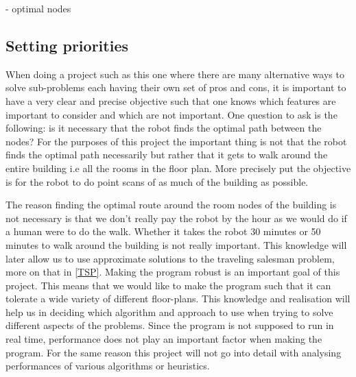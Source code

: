 - optimal nodes

\subsection{Setting priorities}\label{setting_priorities}
When doing a project such as this one where there are many alternative ways to solve sub-problems each having their own set of pros and cons, it is important to have a very clear and precise objective such that one knows which features are important to consider and which are not important. One question to ask is the following: is it necessary that the robot finds the optimal path between the nodes? 
For the purposes of this project the important thing is not that the robot finds the optimal path necessarily but rather that it gets to walk around the entire building i.e all the rooms in the floor plan. More precisely put the objective is for the robot to do point scans of as much of the building as possible. %

The reason finding the optimal route around the room nodes of the building is not necessary is that we don't really pay the robot by the hour as we would do if a human were to do the walk.
Whether it takes the robot 30 minutes or 50 minutes to walk around the building is not really important. This knowledge will later allow us to use approximate solutions to the traveling salesman problem, more on that in \ref{TSP}.
Making the program robust is an important goal of this project. This means that we would like to make the program such that it can tolerate a wide variety of different floor-plans.
This knowledge and realisation will help us in deciding which algorithm and approach to use when trying to solve different aspects of the problems. %
Since the program is not supposed to run in real time, performance does not play an important factor when making the program. For the same reason this project will not go into detail with analysing performances of various algorithms or heuristics. 





